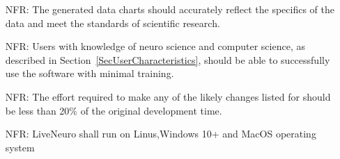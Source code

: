 \documentclass[12pt]{article}
\newcounter{nfrnum} %
\begin{document}
\noindent \begin{itemize}

\item[NFR\refstepcounter{nfrnum}\thenfrnum \label{NFR_Accuracy}:]
The generated data charts should accurately reflect the specifics of the data and meet the standards of scientific research.

\item[NFR\refstepcounter{nfrnum}\thenfrnum \label{NFR_Usability}:]
 Users with knowledge of neuro science and computer science, as described in Section~\ref{SecUserCharacteristics},
  should be able to successfully use the software with minimal training.

\item[NFR\refstepcounter{nfrnum}\thenfrnum \label{NFR_Maintainability}:]
The effort required to make any of the likely
    changes listed for \progname{} should be less than 20\% of the original
    development time.


\item[NFR\refstepcounter{nfrnum}\thenfrnum \label{NFR_Portability}:]
LiveNeuro shall run on Linus,Windows 10+ and MacOS operating system


\end{itemize}
\end{document}
